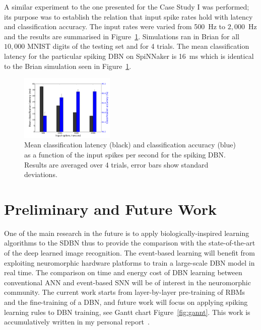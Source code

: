 \documentclass[journal]{journal}
\begin{document}
	A similar experiment to the one presented for the Case Study I was performed; its purpose was to establish the relation that input spike rates hold with latency and classification accuracy.
	The input rates were varied from 500~Hz to $2,000$~Hz and the results are summarised in Figure~\ref{Fig:brianLatency}. Simulations ran in Brian for all $10,000$ MNIST digits of the testing set and for 4 trials. 
	The mean classification latency for the particular spiking DBN on SpiNNaker is 16~ms which is identical to the Brian simulation seen in Figure~\ref{Fig:brianLatency}.
	
	\begin{figure}[hbt!]
		\centering
		\includegraphics[width=0.4\textwidth]{images/evan/latencyCAfiringrate.pdf}
		\caption{Mean classification latency (black) and classification accuracy (blue) as a function of the input spikes per second for the spiking DBN. Results are averaged over 4 trials, error bars show standard deviations.}
		\label{Fig:brianLatency}
	\end{figure} 
	
\section{Preliminary and Future Work}
	One of the main research in the future is to apply biologically-inspired learning algorithms to the SDBN thus to provide the comparison with the state-of-the-art of the deep learned image recognition.
	The event-based learning will benefit from exploiting neuromorphic hardware platforms to train a large-scale DBN model in real time.
	The comparison on time and energy cost of DBN learning between conventional ANN and event-based SNN will be of interest in the neuromorphic community. 
	The current work starts from layer-by-layer pre-training of RBMs and the fine-training of a DBN, and future work will focus on applying spiking learning rules to DBN training, see Gantt chart Figure~\ref{fig:gannt}.
	This work is accumulatively written in my personal report~\cite{liu2015sdbn}. 
	
\end{document}
